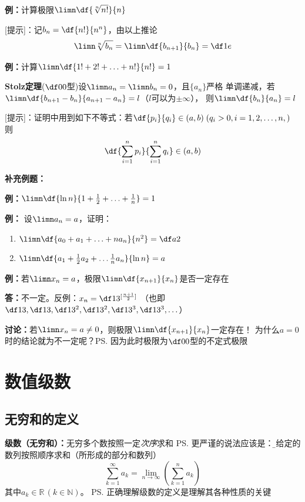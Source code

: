 {\bf 例：}计算极限$\limn\df{\sqrt[n]{n!}}{n}$

[提示]：记$b_n=\df{n!}{n^n}$，由以上推论
$$\limn\sqrt[n]{b_n}=\limn\df{b_{n+1}}{b_n}=\df1e$$

{\bf 例：}计算$\limn\df{1!+2!+\ldots+n!}{n!}=1$

{\b{\bf Stolz定理}($\df00$型)设$\limn a_n=\limn b_n=0$，且$\{a_n\}$严格
单调递减，若$\limn\df{b_{n+1}-b_n}{a_{n+1}-a_n}=l$（$l$可以为$\pm\infty$），
则$\limn\df{b_n}{a_n}=l$}

[提示]：证明中用到如下不等式：若$\df{p_i}{q_i}\in(a,b)\;(q_i>0,i=1,2,\ldots,n,)$
则
$$\df{\sum\limits_{i=1}^np_i}{\sum\limits_{i=1}^nq_i}\in(a,b)$$

{\bf 补充例题：}


{\bf 例：}$\limn\df{\ln n}{1+\frac12+\ldots+\frac1n}=1$

{\bf 例：} 设$\limn a_n=a$，证明：
\begin{enumerate}[(1)]
  \setlength{\itemindent}{1cm}
  \item $\limn\df{a_0+a_1+\ldots+na_n}{n^2}=\df a2$
  \item $\limn\df{a_1+\frac12a_2+\ldots\frac1na_n}{\ln n}=a$
\end{enumerate}

{\bf 例：}若$\limn x_n=a$，极限$\limn\df{x_{n+1}}{x_n}$是否一定存在

{\bf 答：}不一定。反例：$x_n=\df1{3^{[\frac{n+1}2]}}$ （也即
$\df13, \df13, \df 1{3^2}, \df1{3^2}, \df1{3^3}, \df1{3^3},\ldots$）

{\bf 讨论：}若$\limn x_n=a\ne 0$，则极限$\limn\df{x_{n+1}}{x_n}$一定存在！
为什么$a=0$时的结论就为不一定呢？\ps{因为此时极限为$\df00$型的不定式极限}

\newpage

\section{数值级数}

\subsection{无穷和的定义}

{\bf 级数（无穷和）：}无穷多个数按照一定{\it 次序}求和
\ps{更严谨的说法应该是：\b 对给定的数列按照顺序求和（所形成的部分和数列）}
$$\sum\limits_{k=1}^{\infty}a_k
=\lim_{n\to\infty}\left(\sum_{k=1}^na_k\right)$$  
其中$a_k\in\mathbb{R}\,(k\in\mathbb{N})$。
\ps{正确理解级数的定义是理解其各种性质的关键}

